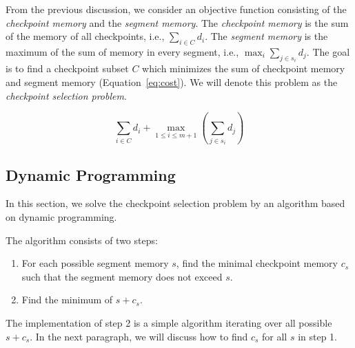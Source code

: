 From the previous discussion, we consider an objective function consisting of the {\em checkpoint memory} and the {\em segment memory}.
The {\em checkpoint memory} is the sum of the memory of all checkpoints, i.e., $\sum_{i \in C} d_i$.
The {\em segment memory} is the maximum of the sum of memory in every segment, i.e., $\max_i {\sum_{j \in s_i} d_j}$.
The goal is to find a checkpoint subset $C$ which minimizes the sum of checkpoint memory and segment memory (Equation~\ref{eq:cost}).
We will denote this problem as the {\em checkpoint selection problem}.

\begin{equation}
\sum_{i \in C} d_i + \max_{1 \leq i \leq m+1}({\sum_{j \in s_i} d_j}) \label{eq:cost}
\end{equation}

\subsection{Dynamic Programming}

In this section, we solve the checkpoint selection problem by an algorithm based on dynamic programming.

The algorithm consists of two steps:
\begin{enumerate}
    \item For each possible segment memory $s$, find the minimal checkpoint memory $c_s$ such that the segment memory does not exceed $s$.
    \item Find the minimum of $s + c_s$.
\end{enumerate}
The implementation of step 2 is a simple algorithm iterating over all possible $s + c_s$.
In the next paragraph, we will discuss how to find $c_s$ for all $s$ in step 1.

